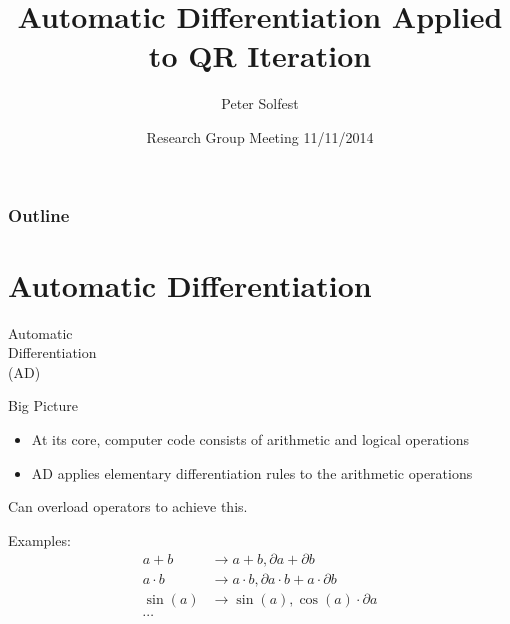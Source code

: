 \documentclass[12pt]{beamer}
\title[]
{
  Automatic Differentiation Applied \\
  to QR Iteration
}
\author{Peter Solfest}
\institute{University of Minnesota\\Department of Computer Science and Engineering}
\date{Research Group Meeting 11/11/2014}
\begin{document}
	\frame{\titlepage}

	\begin{frame}
		\frametitle{Outline}
		\tableofcontents
	\end{frame}
	

	\section{Automatic Differentiation}
	\begin{frame}{}
    \centering
    {\huge Automatic \\Differentiation \\(AD)}	
	\end{frame}	
	
	\begin{frame}{Big Picture}
    \begin{itemize}
      \item At its core, computer code consists of arithmetic and logical operations
      \item AD applies elementary differentiation rules to the arithmetic operations
    \end{itemize}
    \begin{center}
    Can overload operators to achieve this.
    
    Examples:
    \begin{align*}
      a + b &\to {a+b, \partial a + \partial b}\\
      a \cdot b &\to {a \cdot b, \partial a \cdot b + a \cdot \partial b}\\
      \sin(a) &\to {\sin(a) , \cos(a) \cdot \partial a}\\
      \cdots
    \end{align*}
    \end{center}
	\end{frame}
\end{document}
